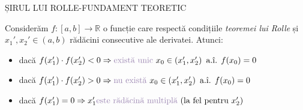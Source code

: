 \documentclass[10pt]{article}
\begin{document}
\begin{multicols*}{3}
\begin{conceptbox}[firebrick]{ȘIRUL LUI ROLLE-FUNDAMENT TEORETIC}
	\begin{quotebox}[brown]
	 \quad Considerăm $f:\left[a, b\right]\to\mathbb{R}$ o funcție care respectă condițiile \textit{teoremei lui Rolle} și $x_1', x_2'\in\left(a, b\right)$ rădăcini consecutive ale derivatei. Atunci:
	 \begin{itemize}
	 \color{firebrick}
	 \item dacă $f(x_1')\cdot f(x_2') < 0 \Rightarrow \text{\color{v1!70!black} există unic } x_0 \in \left(x_1', x_2'\right) \text{ a.î. } f(x_0) = 0$ \\
	 \item dacă $f(x_1')\cdot f(x_2') > 0 \Rightarrow \text{\color{v1!70!black} nu există } x_0 \in \left(x_1', x_2'\right) \text{ a.î. } f(x_0) = 0$ \\
	 \item dacă $f(x_1') = 0 \Rightarrow  x_1' \text{\color{v1!70!black} este rădăcină multiplă } \text{(la fel pentru } x_2')$
	 \end{itemize}
	 \end{quotebox}
	\end{conceptbox}
\end{multicols*}
\newpage
\end{document}
